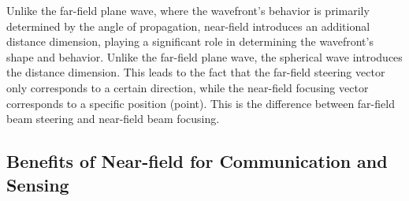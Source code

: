 \documentclass[10pt,journal,twocolumn,twoside]{IEEEtran} %
\begin{document}
Unlike the far-field plane wave, where the wavefront's behavior is primarily determined by the angle of propagation, near-field introduces an additional distance dimension, playing a significant role in determining the wavefront's shape and behavior. 
Unlike the far-field plane wave, the spherical wave introduces the distance dimension. 
This leads to the fact that the far-field steering vector only corresponds to a certain direction, while the near-field focusing vector corresponds to a specific position (point). This is the difference between far-field beam steering and near-field beam focusing. 

\subsection{Benefits of Near-field for Communication and Sensing}
\end{document}
